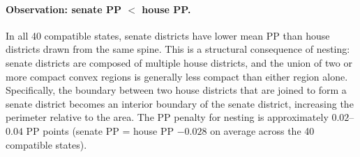 \paragraph{Observation: senate PP $<$ house PP.}
In all 40 compatible states, senate districts have lower mean PP than house
districts drawn from the same spine. This is a structural consequence of
nesting: senate districts are composed of multiple house districts, and the
union of two or more compact convex regions is generally less compact than
either region alone. Specifically, the boundary between two house districts
that are joined to form a senate district becomes an interior boundary
of the senate district, increasing the perimeter relative to the area.
The PP penalty for nesting is approximately $0.02$--$0.04$ PP points
(senate PP = house PP $- 0.028$ on average across the 40 compatible states).
